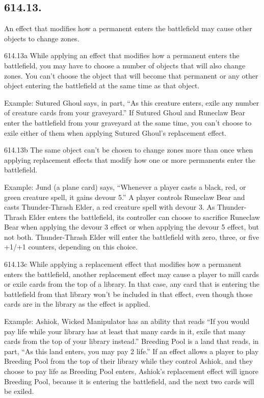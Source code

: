 \subsection*{614.13.}
An effect that modifies how a permanent enters the battlefield may cause other objects to change zones.

614.13a While applying an effect that modifies how a permanent enters the battlefield, you may have to choose a number of objects that will also change zones. You can’t choose the object that will become that permanent or any other object entering the battlefield at the same time as that object.

Example: Sutured Ghoul says, in part, “As this creature enters, exile any number of creature cards from your graveyard.” If Sutured Ghoul and Runeclaw Bear enter the battlefield from your graveyard at the same time, you can’t choose to exile either of them when applying Sutured Ghoul’s replacement effect.

614.13b The same object can’t be chosen to change zones more than once when applying replacement effects that modify how one or more permanents enter the battlefield.

Example: Jund (a plane card) says, “Whenever a player casts a black, red, or green creature spell, it gains devour 5.” A player controls Runeclaw Bear and casts Thunder-Thrash Elder, a red creature spell with devour 3. As Thunder-Thrash Elder enters the battlefield, its controller can choose to sacrifice Runeclaw Bear when applying the devour 3 effect or when applying the devour 5 effect, but not both. Thunder-Thrash Elder will enter the battlefield with zero, three, or five +1/+1 counters, depending on this choice.

614.13c While applying a replacement effect that modifies how a permanent enters the battlefield, another replacement effect may cause a player to mill cards or exile cards from the top of a library. In that case, any card that is entering the battlefield from that library won’t be included in that effect, even though those cards are in the library as the effect is applied.

Example: Ashiok, Wicked Manipulator has an ability that reads “If you would pay life while your library has at least that many cards in it, exile that many cards from the top of your library instead.” Breeding Pool is a land that reads, in part, “As this land enters, you may pay 2 life.” If an effect allows a player to play Breeding Pool from the top of their library while they control Ashiok, and they choose to pay life as Breeding Pool enters, Ashiok’s replacement effect will ignore Breeding Pool, because it is entering the battlefield, and the next two cards will be exiled.

